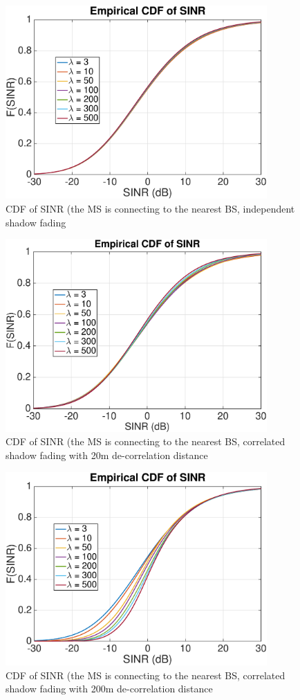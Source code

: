  \begin{figure}
 \centering
 \includegraphics[width=10cm]{NBMax1000OutageProbCDFiid.eps}
 \caption{CDF of SINR (the MS is connecting to the nearest BS, independent shadow fading}
 \label{4:Mode1}
 \end{figure}
 \begin{figure}
 \centering
 \includegraphics[width=10cm]{NBMax1000OutageProbCDFDeCorr20.eps}
 \caption{CDF of SINR (the MS is connecting to the nearest BS, correlated shadow fading with 20m de-correlation distance}
 \label{4:Mode2}
 \end{figure}
 \begin{figure}
 \centering
 \includegraphics[width=10cm]{NBMax1000OutageProbCDFDeCorr200.eps}
 \caption{CDF of SINR (the MS is connecting to the nearest BS, correlated shadow fading with 200m de-correlation distance}
 \label{4:Mode3}
 \end{figure}


